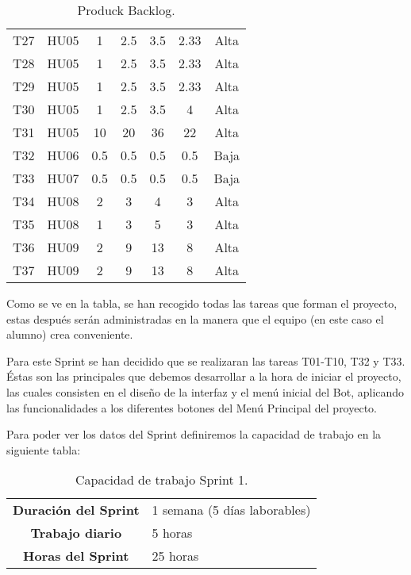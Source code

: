 \begin{table}[H]
\begin{center}
\begin{longtable}{| c | c | c | c | c | c | c |}
			T27 & HU05 & 1 & 2.5 & 3.5 & 2.33 & Alta \\
			T28 & HU05 & 1 & 2.5 & 3.5 & 2.33 & Alta \\
			T29 & HU05 & 1 & 2.5 & 3.5 & 2.33 & Alta \\
			T30 & HU05 & 1 & 2.5 & 3.5 & 4 & Alta \\
			T31 & HU05 & 10 & 20 & 36 & 22 & Alta \\
			T32 & HU06 & 0.5 & 0.5 & 0.5 & 0.5 & Baja \\
			T33 & HU07 & 0.5 & 0.5 & 0.5 & 0.5 & Baja \\
			T34 & HU08 & 2 & 3 & 4 & 3 & Alta \\
			T35 & HU08 & 1 & 3 & 5 & 3 & Alta \\
			T36 & HU09 & 2 & 9 & 13 & 8 & Alta \\
			T37 & HU09 & 2 & 9 & 13 & 8 & Alta \\ \hline
		\end{longtable}
		\caption{Produck Backlog.}
	\end{center}
\end{table}

Como se ve en la tabla, se han recogido todas las tareas que forman el proyecto, estas después serán administradas en la manera que el equipo (en este caso el alumno) crea conveniente.

Para este Sprint se han decidido que se realizaran las tareas T01-T10, T32 y T33. Éstas son las principales que debemos desarrollar a la hora de iniciar el proyecto, las cuales consisten en el diseño de la interfaz y el menú inicial del Bot, aplicando las funcionalidades a los diferentes botones del Menú Principal del proyecto.

Para poder ver los datos del Sprint definiremos la capacidad de trabajo en la siguiente tabla:

\begin{table}[H]
	\begin{center}
		\begin{tabular}{| c | p{9cm} |}
			\hline

			\textbf{Duración del Sprint} & 1 semana (5 días laborables) \\
			\textbf{Trabajo diario} & 5 horas \\
			\textbf{Horas del Sprint} & 25 horas \\ \hline
		\end{tabular}
		\caption{Capacidad de trabajo Sprint 1.}
	\end{center}
\end{table}

